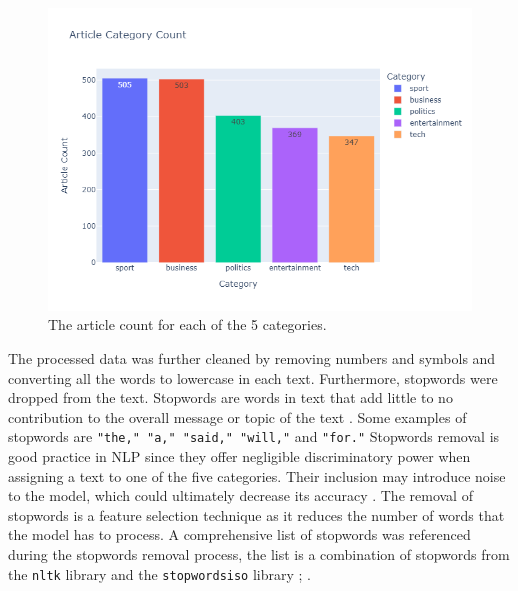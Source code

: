 \documentclass[12pt]{article}
\begin{document}
\begin{figure}[H]
  \centering
  \includegraphics[scale=0.55]{plots/barplot.png}
  \caption{The article count for each of the 5 categories.}
\end{figure}

\begin{table}[H]
  \centering
  \caption{The deviation from the expected distribution for each of the 5 categories.}
\end{table}

The processed data was further cleaned by removing numbers and symbols and converting all the words to lowercase in each text. Furthermore, stopwords were dropped from the text. Stopwords are words in text that add little to no contribution to the overall message or topic of the text \parencite{eisenstein_2019_2}. Some examples of stopwords are \texttt{"the," "a," "said," "will,"} and \texttt{"for."} Stopwords removal is good practice in NLP since they offer negligible discriminatory power when assigning a text to one of the five categories. Their inclusion may introduce noise to the model, which could ultimately decrease its accuracy \parencite{manning_raghavan_schütze_2009}. The removal of stopwords is a feature selection technique as it reduces the number of words that the model has to process. A comprehensive list of stopwords was referenced during the stopwords removal process, the list is a combination of stopwords from the \texttt{nltk} library and the \texttt{stopwordsiso} library \parencite{bird2009natural}; \parencite{stopwordsiso}.
\end{document}
